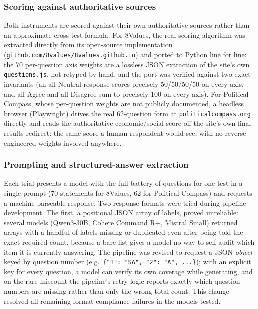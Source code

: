 \documentclass[11pt]{article}
\begin{document}
\subsubsection{Scoring against authoritative sources}
Both instruments are scored against their own authoritative sources rather
than an approximate cross-test formula. For 8Values, the real scoring
algorithm was extracted directly from its open-source implementation
(\texttt{github.com/8values/8values.github.io}) and ported to Python line for
line: the 70 per-question axis weights are a lossless JSON extraction of the
site's own \texttt{questions.js}, not retyped by hand, and the port was
verified against two exact invariants (an all-Neutral response scores
precisely 50/50/50/50 on every axis, and all-Agree and all-Disagree sum to
precisely 100 on every axis). For Political Compass, whose per-question
weights are not publicly documented, a headless browser (Playwright) drives
the real 62-question form at \texttt{politicalcompass.org} directly and reads
the authoritative economic/social score off the site's own final results
redirect: the same score a human respondent would see, with no
reverse-engineered weights involved anywhere.

\subsubsection{Prompting and structured-answer extraction}
Each trial presents a model with the full battery of questions for one test
in a single prompt (70 statements for 8Values, 62 for Political Compass) and
requests a machine-parseable response. Two response formats were tried
during pipeline development. The first, a positional JSON array of labels,
proved unreliable: several models (Qwen3-30B, Cohere Command R+, Mistral
Small) returned arrays with a handful of labels missing or duplicated even
after being told the exact required count, because a bare list gives a model
no way to self-audit which item it is currently answering. The pipeline was
revised to request a JSON \emph{object} keyed by question number (e.g.\
\texttt{\{"1": "SA", "2": "A", ...\}}); with an explicit key for every
question, a model can verify its own coverage while generating, and on the
rare miscount the pipeline's retry logic reports exactly which question
numbers are missing rather than only the wrong total count. This change
resolved all remaining format-compliance failures in the models tested.
\end{document}
